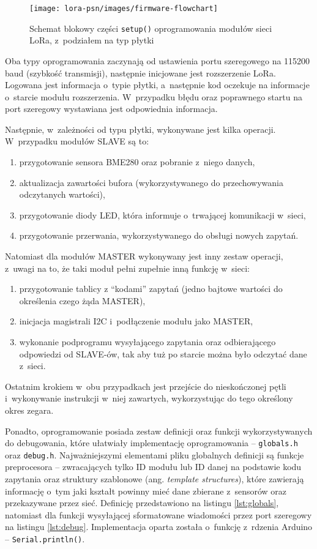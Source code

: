 \begin{figure}[!htbp]
    \centering
    \texttt{[image: lora-psn/images/firmware-flowchart]}
    \caption{\label{img:firmware-flowchart}Schemat blokowy części \texttt{setup()} oprogramowania modułów sieci LoRa,
        z~podziałem na typ płytki}
\end{figure}

Oba typy oprogramowania zaczynają od ustawienia portu szeregowego na 115200 baud (szybkość transmisji), następnie
inicjowane jest rozszerzenie LoRa. Logowana jest informacja o~typie płytki, a~następnie kod oczekuje na informacje
o~starcie modułu rozszerzenia. W~przypadku błędu oraz poprawnego startu na port szeregowy wystawiana jest odpowiednia
informacja.

Następnie, w~zależności od typu płytki, wykonywane jest kilka operacji. W~przypadku modułów SLAVE są to:
\begin{enumerate}
    \item przygotowanie sensora BME280 oraz pobranie z~niego danych,
    \item aktualizacja zawartości bufora (wykorzystywanego do przechowywania odczytanych wartości),
    \item przygotowanie diody LED, która informuje o~trwającej komunikacji w~sieci,
    \item przygotowanie przerwania, wykorzystywanego do obsługi nowych zapytań.
\end{enumerate}

Natomiast dla modułów MASTER wykonywany jest inny zestaw operacji, z~uwagi na to, że taki moduł pełni zupełnie inną
funkcję w~sieci:
\begin{enumerate}
    \item przygotowanie tablicy z \enquote{kodami} zapytań (jedno bajtowe wartości do określenia czego żąda MASTER),
    \item inicjacja magistrali I2C i~podłączenie modułu jako MASTER,
    \item wykonanie podprogramu wysyłającego zapytania oraz odbierającego odpowiedzi od SLAVE-ów, tak aby tuż po
          starcie można było odczytać dane z~sieci.
\end{enumerate}
Ostatnim krokiem w~obu przypadkach jest przejście do nieskończonej pętli i~wykonywanie instrukcji w~niej zawartych,
wykorzystując do tego określony okres zegara.

Ponadto, oprogramowanie posiada zestaw definicji oraz funkcji wykorzystywanych do debugowania, które ułatwiały
implementację oprogramowania -- \texttt{globals.h} oraz \texttt{debug.h}. Najważniejszymi elementami pliku globalnych
definicji są funkcje preprocesora -- zwracających tylko ID modułu lub ID danej na podstawie kodu zapytania oraz
struktury szablonowe (ang. \textsl{template structures}), które zawierają informację o~tym jaki kształt powinny mieć
dane zbierane z~sensorów oraz przekazywane przez sieć. Definicję przedstawiono na listingu \ref{lst:globals}, natomiast
dla funkcji wysyłającej sformatowane wiadomości przez port szeregowy na listingu \ref{lst:debug}. Implementacja oparta
została o~funkcję z~rdzenia Arduino -- \texttt{Serial.println()}.

